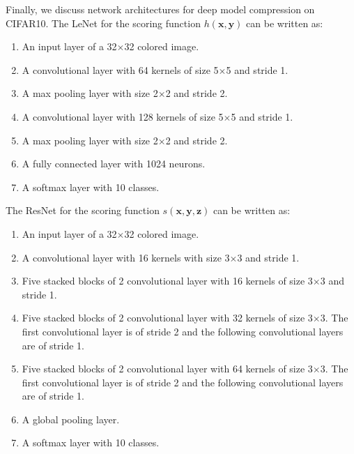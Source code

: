\documentclass{article}
\newcommand{\OVEC}[1]{\bm{#1}} %
\begin{document}
Finally, we discuss network architectures for deep model compression on CIFAR10.
The LeNet for the scoring function $h(\OVEC{x},\OVEC{y})$ can be written as:
\begin{enumerate}
\item An input layer of a 32$\times$32 colored image.
\item A convolutional layer with 64 kernels of size 5$\times$5 and stride 1.
\item A max pooling layer with size 2$\times$2 and stride 2.
\item A convolutional layer with 128 kernels of size 5$\times$5 and stride 1.
\item A max pooling layer with size 2$\times$2 and stride 2.
\item A fully connected layer with 1024 neurons.
\item A softmax layer with 10 classes.
\end{enumerate}
The ResNet for the scoring function $s(\OVEC{x},\OVEC{y},\OVEC{z})$ can be written as:
\begin{enumerate}
\item An input layer of a 32$\times$32 colored image.
\item A convolutional layer with 16 kernels with size 3$\times$3 and stride 1.
\item Five stacked blocks of 2 convolutional layer with 16 kernels of size 3$\times$3 and stride 1.
\item Five stacked blocks of 2 convolutional layer with 32 kernels of size 3$\times$3.
The first convolutional layer is of stride 2 and the following convolutional layers are of stride 1.
\item Five stacked blocks of 2 convolutional layer with 64 kernels of size 3$\times$3.
The first convolutional layer is of stride 2 and the following convolutional layers are of stride 1.
\item A global pooling layer.
\item A softmax layer with 10 classes.
\end{enumerate}
\end{document}
